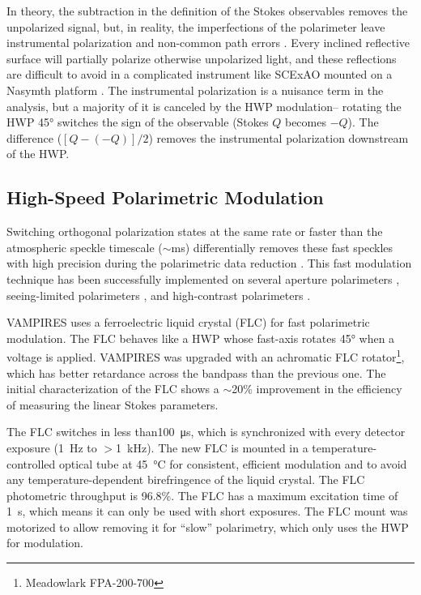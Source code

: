 In theory, the subtraction in the definition of the Stokes observables removes the unpolarized signal, but, in reality, the imperfections of the polarimeter leave instrumental polarization and non-common path errors \citep{kuhn_imaging_2001,tinbergen_astronomical_2005}. Every inclined reflective surface will partially polarize otherwise unpolarized light, and these reflections are difficult to avoid in a complicated instrument like SCExAO mounted on a Nasymth platform \citep{tinbergen_accurate_2007}. The instrumental polarization is a nuisance term in the analysis, but a majority of it is canceled by the HWP modulation-- rotating the HWP \ang{45} switches the sign of the observable (Stokes $Q$ becomes $-Q$). The difference ($[Q - (-Q)]/2$) removes the instrumental polarization downstream of the HWP.

\subsection{High-Speed Polarimetric Modulation}

Switching orthogonal polarization states at the same rate or faster than the atmospheric speckle timescale ($\sim$\si{\milli\second}) differentially removes these fast speckles with high precision during the polarimetric data reduction \citep{kemp_piezo-optical_1969}. This fast modulation technique has been successfully implemented on several aperture polarimeters \citep{rodenhuis_extreme_2012,harrington_innopol_2014,bailey_high-sensitivity_2015,bailey_high-precision_2017,bailey_hippi-2_2020}, seeing-limited polarimeters \citep{safonov_speckle_2017,bailey_picsarr_2023}, and high-contrast polarimeters \citep{norris_vampires_2015,schmid_spherezimpol_2018}. 

VAMPIRES uses a ferroelectric liquid crystal (FLC) for fast polarimetric modulation. The FLC behaves like a HWP whose fast-axis rotates \ang{45} when a voltage is applied. VAMPIRES was upgraded with an achromatic FLC rotator\footnote{Meadowlark FPA-200-700}, which has better retardance across the bandpass than the previous one. The initial characterization of the FLC shows a $\sim$20\% improvement in the efficiency of measuring the linear Stokes parameters.

The FLC switches in less than\SI{100}{\micro\second}, which is synchronized with every detector exposure (\SI{1}{\hertz} to $>$\SI{1}{\kilo\hertz}). The new FLC is mounted in a temperature-controlled optical tube at \SI{45}{\celsius} for consistent, efficient modulation and to avoid any temperature-dependent birefringence of the liquid crystal. The FLC photometric throughput is 96.8\%. The FLC has a maximum excitation time of \SI{1}{\second}, which means it can only be used with short exposures. The FLC mount was motorized to allow removing it for ``slow'' polarimetry, which only uses the HWP for modulation.


